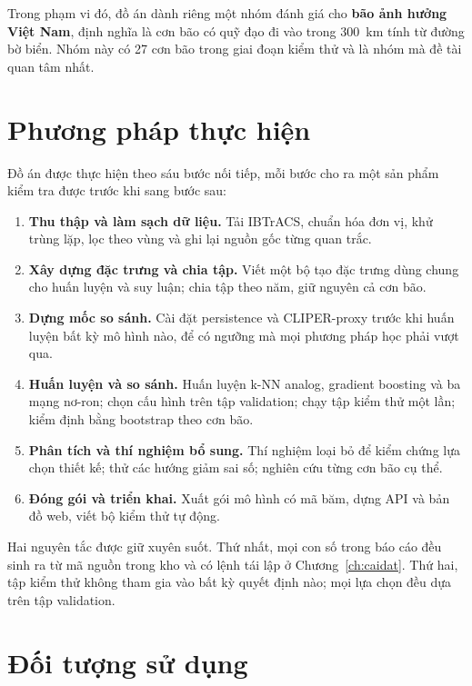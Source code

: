 Trong phạm vi đó, đồ án dành riêng một nhóm đánh giá cho \textbf{bão ảnh hưởng
Việt Nam}, định nghĩa là cơn bão có quỹ đạo đi vào trong 300~km tính từ đường
bờ biển. Nhóm này có 27 cơn bão trong giai đoạn kiểm thử và là nhóm mà đề tài
quan tâm nhất.

\section{Phương pháp thực hiện}

Đồ án được thực hiện theo sáu bước nối tiếp, mỗi bước cho ra một sản phẩm
kiểm tra được trước khi sang bước sau:
\begin{enumerate}[leftmargin=1.8em, itemsep=2pt]
  \item \textbf{Thu thập và làm sạch dữ liệu.} Tải IBTrACS, chuẩn hóa đơn vị,
        khử trùng lặp, lọc theo vùng và ghi lại nguồn gốc từng quan trắc.
  \item \textbf{Xây dựng đặc trưng và chia tập.} Viết một bộ tạo đặc trưng dùng
        chung cho huấn luyện và suy luận; chia tập theo năm, giữ nguyên cả cơn
        bão.
  \item \textbf{Dựng mốc so sánh.} Cài đặt persistence và CLIPER-proxy trước
        khi huấn luyện bất kỳ mô hình nào, để có ngưỡng mà mọi phương pháp học
        phải vượt qua.
  \item \textbf{Huấn luyện và so sánh.} Huấn luyện k-NN analog, gradient
        boosting và ba mạng nơ-ron; chọn cấu hình trên tập validation; chạy tập
        kiểm thử một lần; kiểm định bằng bootstrap theo cơn bão.
  \item \textbf{Phân tích và thí nghiệm bổ sung.} Thí nghiệm loại bỏ để kiểm
        chứng lựa chọn thiết kế; thử các hướng giảm sai số; nghiên cứu từng
        cơn bão cụ thể.
  \item \textbf{Đóng gói và triển khai.} Xuất gói mô hình có mã băm, dựng API
        và bản đồ web, viết bộ kiểm thử tự động.
\end{enumerate}

Hai nguyên tắc được giữ xuyên suốt. Thứ nhất, mọi con số trong báo cáo đều
sinh ra từ mã nguồn trong kho và có lệnh tái lập ở Chương~\ref{ch:caidat}.
Thứ hai, tập kiểm thử không tham gia vào bất kỳ quyết định nào; mọi lựa chọn
đều dựa trên tập validation.

\section{Đối tượng sử dụng}

